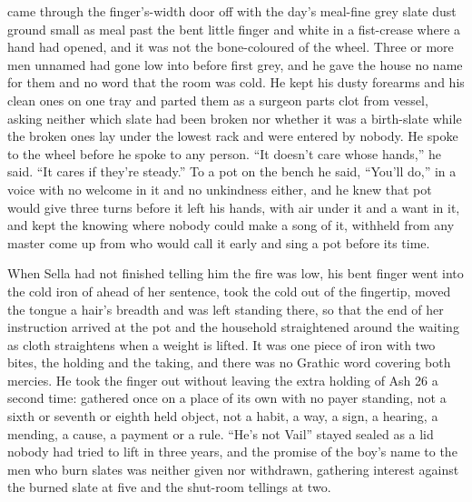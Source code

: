  came through the finger's-width door off  with the day's meal-fine grey slate dust ground small as meal past the bent little finger and white in a fist-crease where a hand had opened, and it was not the bone-coloured  of the wheel. Three or more men unnamed had gone low into  before first grey, and he gave the house no name for them and no word that the room was cold. He kept his dusty forearms and his clean ones on one tray and parted them as a surgeon parts clot from vessel, asking neither which slate had been broken nor whether it was a birth-slate while the broken ones lay under the lowest rack and were entered by nobody. He spoke to the wheel before he spoke to any person. “It doesn't care whose hands,” he said. “It cares if they're steady.” To a pot on the bench he said, “You'll do,” in a voice with no welcome in it and no unkindness either, and he knew  that pot would give three turns before it left his hands, with air under it and a want in it, and kept the knowing where nobody could make a song of it, withheld from any master come up from  who would call it early and sing a pot before its time.

When Sella had not finished telling him the fire was low, his bent finger went into the cold iron of  ahead of her sentence, took the cold out of the fingertip, moved the tongue a hair's breadth and was left standing there, so that the end of her instruction arrived at the pot and the household straightened around the waiting as cloth straightens when a weight is lifted. It was one piece of iron with two bites, the holding and the taking, and there was no Grathic word covering both mercies. He took the finger out without leaving the extra holding of Ash 26 a second time: gathered once on a place of its own with no payer standing, not a sixth or seventh or eighth held object, not a habit, a way, a sign, a hearing, a mending, a cause, a payment or a rule. “He's not Vail” stayed sealed as a lid nobody had tried to lift in three years, and the promise of the boy's name to the men who burn slates was neither given nor withdrawn, gathering interest against the burned slate at five and the shut-room tellings at two.

\scenebreak

